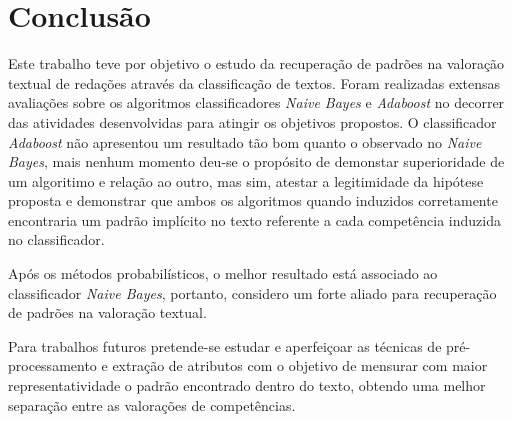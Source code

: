 \section{Conclusão}

Este trabalho teve por objetivo o estudo da recuperação de padrões na valoração 
textual de redações através da classificação de textos. Foram realizadas 
extensas avaliações sobre os algoritmos classificadores \textit{Naive Bayes} e 
\textit{Adaboost} no decorrer das atividades desenvolvidas para atingir os 
objetivos propostos. O classificador \textit{Adaboost} não apresentou um 
resultado tão bom quanto o observado no \textit{Naive Bayes}, mais nenhum 
momento deu-se o propósito de demonstar superioridade de um algoritimo e 
relação ao outro, mas sim, atestar a legitimidade da hipótese proposta e 
demonstrar que ambos os algoritmos quando induzidos corretamente encontraria um 
padrão implícito no texto referente a cada competência induzida no 
classificador. 

Após os métodos probabilísticos, o melhor resultado está associado ao 
classificador \textit{Naive Bayes}, portanto, considero um forte aliado para 
recuperação de padrões na valoração textual.

Para trabalhos futuros pretende-se estudar e aperfeiçoar as técnicas de 
pré-processamento e extração de atributos com o objetivo de mensurar com maior 
representatividade o padrão encontrado dentro do texto, obtendo uma melhor 
separação entre as valorações de competências.